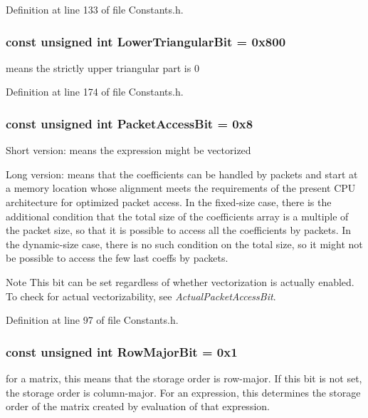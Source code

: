 Definition at line 133 of file Constants.\-h.

\hypertarget{group__flags_gac61c3fd638e895edd7c3d1e89b5d170b}{
\subsubsection[{Lower\-Triangular\-Bit}]{\setlength{\rightskip}{0pt plus 5cm}const unsigned {\bf int} Lower\-Triangular\-Bit = 0x800}}\label{group__flags_gac61c3fd638e895edd7c3d1e89b5d170b}
means the strictly upper triangular part is 0 

Definition at line 174 of file Constants.\-h.

\hypertarget{group__flags_gaa780614dc11271c147db56e9c1524e76}{
\subsubsection[{Packet\-Access\-Bit}]{\setlength{\rightskip}{0pt plus 5cm}const unsigned {\bf int} Packet\-Access\-Bit = 0x8}}\label{group__flags_gaa780614dc11271c147db56e9c1524e76}
Short version\-: means the expression might be vectorized

Long version\-: means that the coefficients can be handled by packets and start at a memory location whose alignment meets the requirements of the present C\-P\-U architecture for optimized packet access. In the fixed-\/size case, there is the additional condition that the total size of the coefficients array is a multiple of the packet size, so that it is possible to access all the coefficients by packets. In the dynamic-\/size case, there is no such condition on the total size, so it might not be possible to access the few last coeffs by packets.

\begin{DoxyNote}{Note}
This bit can be set regardless of whether vectorization is actually enabled. To check for actual vectorizability, see {\itshape Actual\-Packet\-Access\-Bit}. 
\end{DoxyNote}


Definition at line 97 of file Constants.\-h.

\hypertarget{group__flags_ga7bd49e7b260e869e10fb9dc4fd081a85}{
\subsubsection[{Row\-Major\-Bit}]{\setlength{\rightskip}{0pt plus 5cm}const unsigned {\bf int} Row\-Major\-Bit = 0x1}}\label{group__flags_ga7bd49e7b260e869e10fb9dc4fd081a85}
for a matrix, this means that the storage order is row-\/major. If this bit is not set, the storage order is column-\/major. For an expression, this determines the storage order of the matrix created by evaluation of that expression. 

